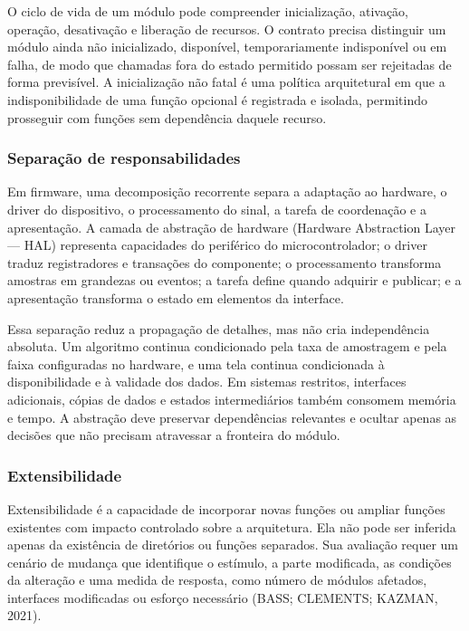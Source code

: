 \documentclass[a4paper,12pt]{article}
\begin{document}
O ciclo de vida de um m\'odulo pode compreender inicializa\c{c}\~ao, ativa\c{c}\~ao, opera\c{c}\~ao, desativa\c{c}\~ao e libera\c{c}\~ao de recursos. O contrato precisa distinguir um m\'odulo ainda n\~ao inicializado, dispon\'ivel, temporariamente indispon\'ivel ou em falha, de modo que chamadas fora do estado permitido possam ser rejeitadas de forma previs\'ivel. A inicializa\c{c}\~ao n\~ao fatal \'e uma pol\'itica arquitetural em que a indisponibilidade de uma fun\c{c}\~ao opcional \'e registrada e isolada, permitindo prosseguir com fun\c{c}\~oes sem depend\^encia daquele recurso.


\subsubsection{Separa\c{c}\~ao de responsabilidades}


Em firmware, uma decomposi\c{c}\~ao recorrente separa a adapta\c{c}\~ao ao hardware, o driver do dispositivo, o processamento do sinal, a tarefa de coordena\c{c}\~ao e a apresenta\c{c}\~ao. A camada de abstra\c{c}\~ao de hardware (Hardware Abstraction Layer --- HAL) representa capacidades do perif\'erico do microcontrolador; o driver traduz registradores e transa\c{c}\~oes do componente; o processamento transforma amostras em grandezas ou eventos; a tarefa define quando adquirir e publicar; e a apresenta\c{c}\~ao transforma o estado em elementos da interface.


Essa separa\c{c}\~ao reduz a propaga\c{c}\~ao de detalhes, mas n\~ao cria independ\^encia absoluta. Um algoritmo continua condicionado pela taxa de amostragem e pela faixa configuradas no hardware, e uma tela continua condicionada \`a disponibilidade e \`a validade dos dados. Em sistemas restritos, interfaces adicionais, c\'opias de dados e estados intermedi\'arios tamb\'em consomem mem\'oria e tempo. A abstra\c{c}\~ao deve preservar depend\^encias relevantes e ocultar apenas as decis\~oes que n\~ao precisam atravessar a fronteira do m\'odulo.


\subsubsection{Extensibilidade}


Extensibilidade \'e a capacidade de incorporar novas fun\c{c}\~oes ou ampliar fun\c{c}\~oes existentes com impacto controlado sobre a arquitetura. Ela n\~ao pode ser inferida apenas da exist\^encia de diret\'orios ou fun\c{c}\~oes separados. Sua avalia\c{c}\~ao requer um cen\'ario de mudan\c{c}a que identifique o est\'imulo, a parte modificada, as condi\c{c}\~oes da altera\c{c}\~ao e uma medida de resposta, como n\'umero de m\'odulos afetados, interfaces modificadas ou esfor\c{c}o necess\'ario (BASS; CLEMENTS; KAZMAN, 2021).
\end{document}

